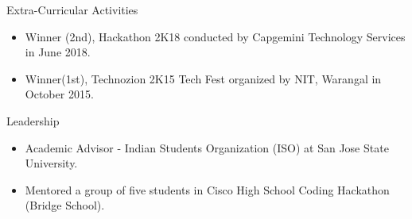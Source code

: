 \documentclass{resume} %
\begin{document}
\vspace{-0.5em}
\begin{rSection}{Extra-Curricular Activities} 
\begin{itemize}
\itemsep -6pt {} 
    \item 	Winner (2nd), Hackathon 2K18 conducted by Capgemini Technology Services in June 2018.
    \item	Winner(1st), Technozion 2K15 Tech Fest organized by NIT, Warangal in October 2015.
\end{itemize}
\end{rSection}

\vspace{-0.5em}
\begin{rSection}{Leadership} 
\begin{itemize}
\itemsep -6pt {} 
    \item Academic Advisor - Indian Students Organization (ISO) at San Jose State University.
      \item Mentored a group of five students in Cisco High School Coding Hackathon (Bridge School).
\end{itemize}


\end{rSection}
\end{document}

